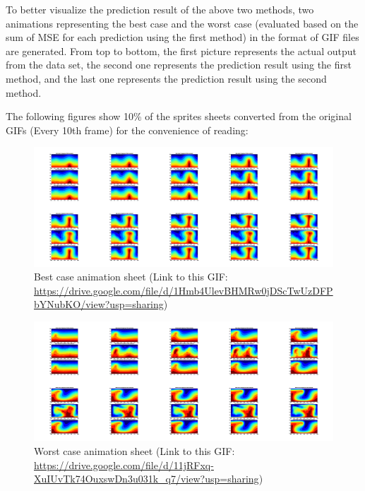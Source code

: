 To better visualize the prediction result of the above two methods, two animations representing the best case and the worst case (evaluated based on the sum of MSE for each prediction using the first method) in the format of GIF files are generated. From top to bottom, the first picture represents the actual output from the data set, the second one represents the prediction result using the first method, and the last one represents the prediction result using the second method.

The following figures show 10\% of the sprites sheets converted from the original GIFs (Every 10th frame) for the convenience of reading:

\begin{figure}[H]
    \centering
    \caption{Best case animation sheet (Link to this GIF: \url{https://drive.google.com/file/d/1Hmb4UlevBHMRw0jDScTwUzDFPbYNubKO/view?usp=sharing})}
    \includegraphics[scale=0.10]{Report LaTeX/figures/mantle_convection_images/limited_dataset/FNN_Best_GIF_sheet.png}
\end{figure}

\begin{figure}[H]
    \centering
    \caption{Worst case animation sheet (Link to this GIF: 
    \url{https://drive.google.com/file/d/11jRFxq-XuIUvTk74OuxswDn3u031k_q7/view?usp=sharing})}
    \includegraphics[scale=0.10]{Report LaTeX/figures/mantle_convection_images/limited_dataset/FNN_Worst_GIF_sheet.png}
\end{figure}

